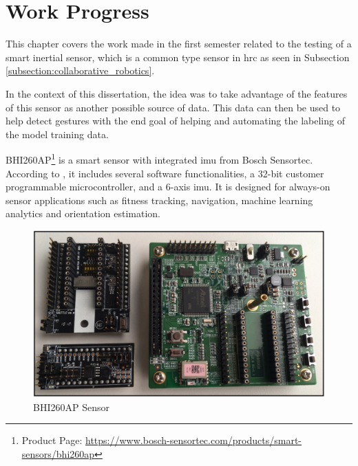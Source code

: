 \chapter{Work Progress}
\label{chapter:work_progress}

This chapter covers the work made in the first semester related to the testing of a smart inertial sensor, which is a common type sensor in \acs{hrc} as seen in Subsection \ref{subsection:collaborative_robotics}.


In the context of this dissertation, the idea was to take advantage of the features of this sensor as another possible source of data. This data can then be used to help detect gestures with the end goal of helping and automating the labeling of the model training data.

BHI260AP\footnote{Product Page: \url{https://www.bosch-sensortec.com/products/smart-sensors/bhi260ap}} is a smart sensor with integrated \acf{imu} from Bosch Sensortec. According to \cite{BoschSensorFlyer}, it includes several software functionalities, a 32-bit customer programmable microcontroller, and a 6-axis \acs{imu}. It is designed for always-on sensor applications such as fitness tracking, navigation, machine learning analytics and orientation estimation.


\begin{figure}[H]
\centerline{\includegraphics[width=5.5in]{figs/sensor.PNG}}
\caption[BHI260AP Sensor]{BHI260AP Sensor \cite{BoschSensorSetupGuide}}
\label{fig:sensor}
\end{figure}

